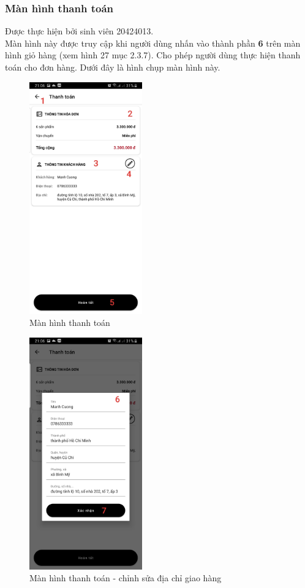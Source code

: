 \documentclass[12pt]{article}
\begin{document}
\subsubsection{Màn hình thanh toán}
Được thực hiện bởi sinh viên 20424013.\\

\indent Màn hình này được truy cập khi người dùng nhấn vào thành phần \textbf{6} trên màn hình giỏ hàng (xem hình 27 mục 2.3.7). Cho phép người dùng thực hiện thanh toán cho đơn hàng. Dưới đây là hình chụp màn hình này.

\begin{figure}[H]
    \centering
    \includegraphics[height=10cm]{images/30.png}
    \caption{Màn hình thanh toán}
\end{figure}

\begin{figure}[H]
    \centering
    \includegraphics[height=10cm]{images/31.png}
    \caption{Màn hình thanh toán - chỉnh sửa địa chỉ giao hàng}
\end{figure}
\end{document}
